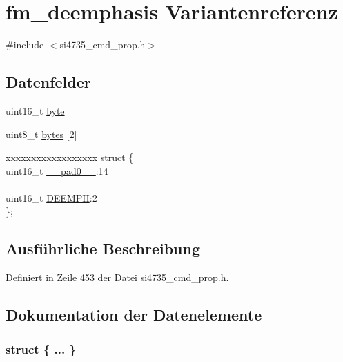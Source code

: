 \hypertarget{unionfm__deemphasis}{}\section{fm\+\_\+deemphasis Variantenreferenz}
\label{unionfm__deemphasis}


{\ttfamily \#include $<$si4735\+\_\+cmd\+\_\+prop.\+h$>$}

\subsection*{Datenfelder}
\begin{DoxyCompactItemize}
\item 
uint16\+\_\+t \hyperlink{unionfm__deemphasis_ab0549c1b5ea980a02e7eab77e21fea49}{byte}
\item 
uint8\+\_\+t \hyperlink{unionfm__deemphasis_a46e4c05d20a047ec169f60d3167e912e}{bytes} \mbox{[}2\mbox{]}
\item 
\begin{tabbing}
xx\=xx\=xx\=xx\=xx\=xx\=xx\=xx\=xx\=\kill
struct \{\\
\>uint16\_t \hyperlink{unionfm__deemphasis_a77132c2c26a75f5b8751b235cda23828}{\_\_pad0\_\_}:14\\
\>\\
\>uint16\_t \hyperlink{unionfm__deemphasis_abc844751c522212f064b9e723213950f}{DEEMPH}:2\\
\}; \\

\end{tabbing}\end{DoxyCompactItemize}


\subsection{Ausführliche Beschreibung}


Definiert in Zeile 453 der Datei si4735\+\_\+cmd\+\_\+prop.\+h.



\subsection{Dokumentation der Datenelemente}
\hypertarget{unionfm__deemphasis_acc0414eb5935806f0f5d808f0e1832da}{}\subsubsection[{"@47}]{\setlength{\rightskip}{0pt plus 5cm}struct \{ ... \} }\label{unionfm__deemphasis_acc0414eb5935806f0f5d808f0e1832da}
\hypertarget{unionfm__deemphasis_a77132c2c26a75f5b8751b235cda23828}{}
